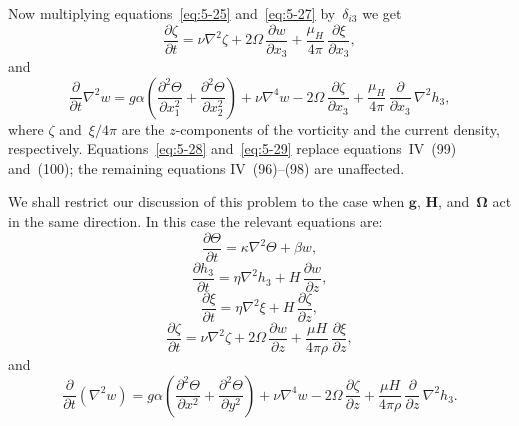 Now multiplying equations~\eqref{eq:5-25} and~\eqref{eq:5-27} by~$\delta_{i3}$
we get
\begin{equation}
  \frac{\partial\zeta}{\partial t}
  = \nu\nabla^{2}\zeta
  + 2\Omega\,\frac{\partial w}{\partial x_3}
  + \frac{\mu_H}{4\pi}\,\frac{\partial\xi}{\partial x_3},
  \label{eq:5-28}
\end{equation}
and
\begin{equation}
  \frac{\partial}{\partial t}\nabla^{2}w
  = g\alpha\!\left(
      \frac{\partial^{2}\Theta}{\partial x_1^{2}}
      + \frac{\partial^{2}\Theta}{\partial x_2^{2}}
    \right)
  + \nu\nabla^{4}w
  - 2\Omega\,\frac{\partial\zeta}{\partial x_3}
  + \frac{\mu_H}{4\pi}\,\frac{\partial}{\partial x_3}\,\nabla^{2}h_3,
  \label{eq:5-29}
\end{equation}
where $\zeta$ and~$\xi/4\pi$ are the $z$-components of the vorticity and the
current density, respectively.  Equations~\eqref{eq:5-28} and~\eqref{eq:5-29}
replace equations~IV~(99) and~(100); the remaining equations IV~(96)--(98) are
unaffected.

We shall restrict our discussion of this problem to the case when
$\mathbf{g}$, $\mathbf{H}$, and~$\boldsymbol{\Omega}$ act in the same
direction.  In this case the relevant equations are:
\begin{equation}
  \frac{\partial\Theta}{\partial t}
  = \kappa\nabla^{2}\Theta + \beta w,
  \label{eq:5-30}
\end{equation}
\begin{equation}
  \frac{\partial h_3}{\partial t}
  = \eta\nabla^{2}h_3 + H\,\frac{\partial w}{\partial z},
  \label{eq:5-31}
\end{equation}
\begin{equation}
  \frac{\partial\xi}{\partial t}
  = \eta\nabla^{2}\xi + H\,\frac{\partial\zeta}{\partial z},
  \label{eq:5-32}
\end{equation}
\begin{equation}
  \frac{\partial\zeta}{\partial t}
  = \nu\nabla^{2}\zeta
  + 2\Omega\,\frac{\partial w}{\partial z}
  + \frac{\mu H}{4\pi\rho}\,\frac{\partial\xi}{\partial z},
  \label{eq:5-33}
\end{equation}
and
\begin{equation}
  \frac{\partial}{\partial t}(\nabla^{2}w)
  = g\alpha\!\left(
      \frac{\partial^{2}\Theta}{\partial x^{2}}
      + \frac{\partial^{2}\Theta}{\partial y^{2}}
    \right)
  + \nu\nabla^{4}w
  - 2\Omega\,\frac{\partial\zeta}{\partial z}
  + \frac{\mu H}{4\pi\rho}\,\frac{\partial}{\partial z}\,\nabla^{2}h_3.
  \label{eq:5-34}
\end{equation}

